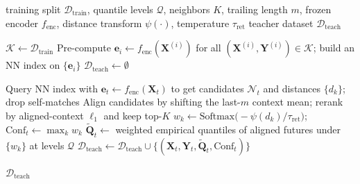 \begin{algorithm}[!htbp]
\caption{Offline Teacher Construction}
\label{alg:teacher}
\begin{algorithmic}[1]
\Require training split $\mathcal{D}_{\text{train}}$, quantile levels $\mathcal{Q}$, neighbors $K$, trailing length $m$,
        frozen encoder $f_{\text{enc}}$, distance transform $\psi(\cdot)$, temperature $\tau_{\text{ret}}$
\Ensure teacher dataset $\mathcal{D}_{\text{teach}}$

\State $\mathcal{K} \gets \mathcal{D}_{\text{train}}$ 
\State Pre-compute $\mathbf{e}_i \gets f_{\text{enc}}(\mathbf{X}^{(i)})$ for all $(\mathbf{X}^{(i)},\mathbf{Y}^{(i)})\in\mathcal{K}$; build an NN index on $\{\mathbf{e}_i\}$
\State $\mathcal{D}_{\text{teach}} \gets \emptyset$

    \State Query NN index with $\mathbf{e}_t \gets f_{\text{enc}}(\mathbf{X}_t)$ to get candidates $\mathcal{N}_t$ and distances $\{d_k\}$; drop self-matches
    \State Align candidates by shifting the last-$m$ context mean; rerank by aligned-context $\ell_1$ and keep top-$K$
    \State $w_k \gets \mathrm{Softmax}\!\big(-\psi(d_k)/\tau_{\text{ret}}\big)$; $\mathrm{Conf}_t \gets \max_k w_k$
    \State $\widetilde{\mathbf{Q}}_t \gets$ weighted empirical quantiles of aligned futures under $\{w_k\}$ at levels $\mathcal{Q}$
    \State $\mathcal{D}_{\text{teach}} \gets \mathcal{D}_{\text{teach}} \cup \{(\mathbf{X}_t,\mathbf{Y}_t,\widetilde{\mathbf{Q}}_t,\mathrm{Conf}_t)\}$
\EndFor

\State \Return $\mathcal{D}_{\text{teach}}$
\end{algorithmic}
\end{algorithm}


